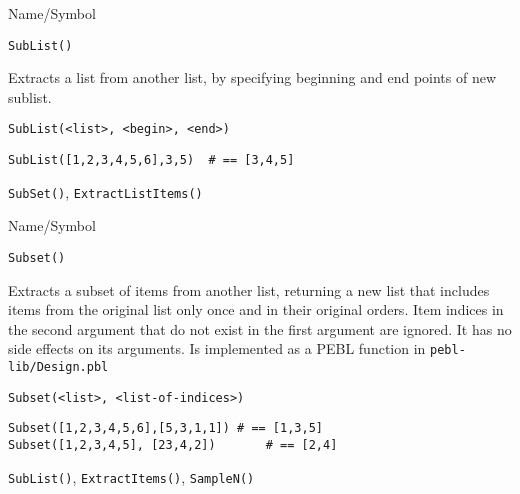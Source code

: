 \begin{desc}{Name/Symbol}
\item[Name/Symbol]  	\verb+SubList()+

\item[Description] 	Extracts a list from another list, by specifying 
	     	beginning and end points of new sublist.

\item[Usage]
\begin{verbatim}
SubList(<list>, <begin>, <end>)
\end{verbatim}

\item[Example]     	
\begin{verbatim}
SubList([1,2,3,4,5,6],3,5)	# == [3,4,5]
\end{verbatim}

\item[See Also]    	\verb+SubSet()+, \verb+ExtractListItems()+
\end{desc}

\rl


\begin{desc}{Name/Symbol}
\item[Name/Symbol]  	\verb+Subset()+

\item[Description] Extracts a subset of items from another list,
  returning a new list that includes items from the original list only
  once and in their original orders.  Item indices in the second
  argument that do not exist in the first argument are ignored.  It
  has no side effects on its arguments.  Is implemented as a PEBL
  function in \verb+pebl-lib/Design.pbl+

\item[Usage]       	
\begin{verbatim}
Subset(<list>, <list-of-indices>)
\end{verbatim}

\item[Example]     	
\begin{verbatim}
Subset([1,2,3,4,5,6],[5,3,1,1])	# == [1,3,5]
Subset([1,2,3,4,5], [23,4,2])		# == [2,4]
\end{verbatim}

\item[See Also]   	\verb+SubList()+, \verb+ExtractItems()+, \verb+SampleN()+
\end{desc}

\rl


